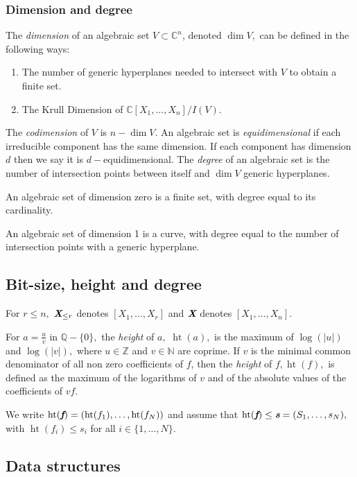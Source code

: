 \documentclass[sigconf]{acmart}
\DeclareMathOperator{\htt}{ht}
\def\C{\mathbb{C}}
\begin{document}
\subsubsection{Dimension and degree}
The \textit{dimension} of an algebraic set $V \subset \C^n$, denoted $\dim V,$ can be defined in the following ways:
\begin{enumerate}
    \item The number of generic hyperplanes needed to intersect with $V$ to obtain a finite set. 
    \item The Krull Dimension of $\C[X_1,\hdots,X_n]/I(V)$.
\end{enumerate}
The \textit{codimension} of $V$ is $n - \dim V$. An algebraic set is \textit{equidimensional} if each irreducible component has the same dimension.  If each component has dimension $d$ then we say it is $d-$equidimensional. 
The \textit{degree} of an algebraic set is the number of intersection points between itself and $\dim V$ generic hyperplanes.
\begin{example} 
An algebraic set of dimension zero is a finite set, with degree equal to its cardinality.
\end{example}
\begin{example}
An algebraic set of dimension 1 is a curve, with degree equal to the number of intersection points with a generic hyperplane.
\end{example}
%
%
%
%
\subsection{Bit-size, height and degree}
For $r \leq n,$ $\textit{\textbf{X}}_{\leq r}$ denotes $[X_1,\hdots,X_r]$ and $\textit{\textbf{X}}$ denotes $[X_1,\hdots,X_n]$. 
\par 
For $a=\frac{u}{v}$ in $\mathbb{Q}-\{0\},$ the  \textit{height} of $a,$ $\htt(a),$ is the maximum of $\log(|u|)$ and $\log(|v|),$ where $u \in \mathbb{Z}$ and $v \in \mathbb{N}$ are coprime. If $v$ is the minimal common denominator of all non zero coefficients of $f$, then the \textit{height} of $f, \htt(f),$ is defined as the maximum of the logarithms of $v$ and of the absolute values of the coefficients of $vf$. 
%
\par
We write $\htt(\textit{\textbf{f}})=(\htt(f_1),\hdots,\htt(f_N))$ and assume that $\htt(\textit{\textbf{f}}) \leq \textit{\textbf{s}} = (S_1,\hdots,s_N),$  with $\htt(f_i) \leq s_i$ for all $i \in \{ 1,\hdots,N\}.$
%
%
\subsection{Data structures}
\end{document}
